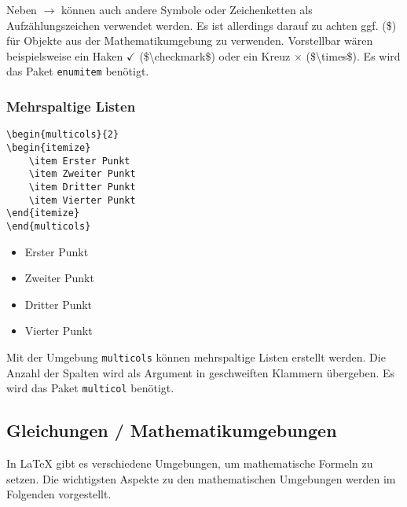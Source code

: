 Neben $\rightarrow$ können auch andere Symbole oder Zeichenketten als Aufzählungszeichen verwendet werden. Es ist allerdings darauf zu achten ggf. (\$) für Objekte aus der Mathematikumgebung zu verwenden. Vorstellbar wären beispielsweise ein Haken $\checkmark$ (\$\textbackslash checkmark\$) oder ein Kreuz $\times$ (\$\textbackslash times\$). Es wird das Paket \texttt{enumitem} benötigt.

\subsubsection{Mehrspaltige Listen}

\begin{minipage}{0.50\textwidth}
    \begin{lstlisting}
\begin{multicols}{2}
\begin{itemize}
    \item Erster Punkt
    \item Zweiter Punkt
    \item Dritter Punkt
    \item Vierter Punkt
\end{itemize}
\end{multicols}
\end{lstlisting}
\end{minipage}
\hfill
\begin{minipage}{0.48\textwidth}
    \begin{multicols}{2}
        \begin{itemize}
            \item Erster Punkt
            \item Zweiter Punkt
            \item Dritter Punkt
            \item Vierter Punkt
        \end{itemize}
    \end{multicols}
\end{minipage}

Mit der Umgebung \texttt{multicols} können mehrspaltige Listen erstellt werden. Die Anzahl der Spalten wird als Argument in geschweiften Klammern übergeben. Es wird das Paket \texttt{multicol} benötigt.

\subsection{Gleichungen / Mathematikumgebungen}
In \LaTeX{} gibt es verschiedene Umgebungen, um mathematische Formeln zu setzen. Die wichtigsten Aspekte zu den mathematischen Umgebungen werden im Folgenden vorgestellt.

